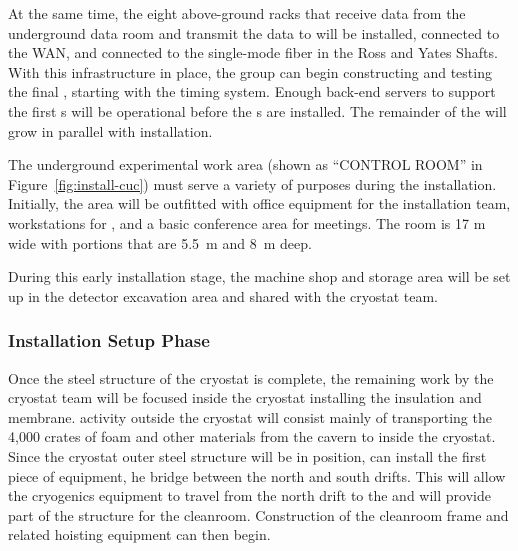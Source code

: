 At the same time, the eight above-ground  racks that receive data from the underground data room and  transmit the data to  will %
be installed, connected to the WAN, and connected to the single-mode fiber in the Ross and Yates Shafts.  With this infrastructure in place, the  group can begin constructing and testing the final  , starting with the %
timing system. %
Enough  back-end servers to support the first s will be operational before the s are installed.  The remainder of the  will grow in parallel with  installation.

The underground experimental work area (shown as ``CONTROL ROOM'' in Figure~\ref{fig:install-cuc}) must serve a variety of purposes during the  installation. Initially, the area will be outfitted with office equipment for the installation team, workstations for , and a basic conference area for meetings. The room is 17 \si{m} wide with portions that are \SI{5.5}{m} and \SI{8}{m} deep.

During this early installation stage, the machine shop and  storage area will %
be set up in the detector excavation area and %
shared with the cryostat team. 

\subsubsection{Installation Setup Phase}
\label{sec:fdsp-tc-inst-setup}

Once the steel structure of the cryostat is complete, the remaining work by the  cryostat team will be focused inside the cryostat installing the insulation and membrane.  
 activity outside the cryostat will %
consist mainly of %
transporting the 4,000 crates of foam and other materials from the cavern to inside the cryostat. %
Since the cryostat outer steel structure will be in position,  can install 
the first piece of equipment, %
he bridge between the north and south drifts. 
This will allow the cryogenics equipment to travel from the north drift to the  and will provide part of the structure for the cleanroom. 
Construction of the cleanroom frame and related hoisting equipment can then begin. 

